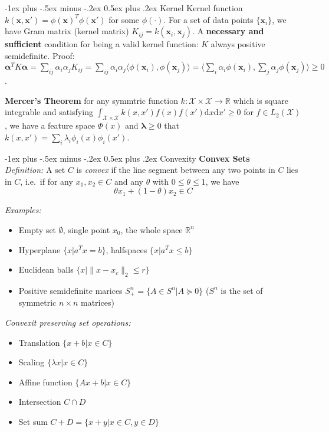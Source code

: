\documentclass[10pt,landscape]{article}
\makeatletter
\newcommand{\vect}[1]{\boldsymbol{#1}}
\renewcommand{\section}{\@startsection{section}{1}{0mm}%
                                {-1ex plus -.5ex minus -.2ex}%
                                {0.5ex plus .2ex}%
                                {\normalfont\large\bfseries}}
\makeatother
\begin{document}
\begin{multicols}{3}
\section{Kernel}
Kernel function $k(\vect{x},\vect{x}') = \phi(\vect{x})^T \phi(\vect{x}')$ for some $\phi(\cdot)$. For a set of data points $\{\vect{x}_i\} $, we have Gram matrix (kernel matrix) $K_{ij} = k(\vect{x}_i, \vect{x}_j)$. A \textbf{necessary and sufficient} condition for being a valid kernel function: $K$ always positive semidefinite. Proof: $\vect{\alpha}^T K \vect{\alpha} = \sum_{ij} \alpha_i \alpha_j K_{ij} = \sum_{ij} \alpha_i \alpha_j \langle \phi(\vect{x}_i), \phi(\vect{x}_j) \rangle = \langle \sum_i \alpha_i \phi(\vect{x}_i),  \sum_j \alpha_j \phi(\vect{x}_j) \rangle \geq 0$.

\textbf{Mercer's Theorem} for any symmtric function $k: \mathcal{X} \times \mathcal{X} \rightarrow \mathbb{R}$ which is square integrable and satisfying $\int_{\mathcal{X} \times \mathcal{X}} k(x,x') f(x) f(x') \mathrm{d}x \mathrm{d}x' \geq 0$ for $f \in L_2(\mathcal{X})$, we have a feature space $\Phi(x)$ and $\vect{\lambda} \geq 0 $ that $k(x,x') = \sum_i \lambda_i \phi_i(x) \phi_i(x')$.


\section{Convexity}
\textbf{Convex Sets} \\
\emph{Definition:} A set $C$ is \emph{convex} if the line segment between any two points in $C$ lies in $C$, i.e.\, if for any $x_1, x_2 \in C$ and any $\theta$ with $0 \leq \theta \leq 1$, we have \\
$$ \theta x_1 + (1 - \theta) x_2 \in C $$

\emph{Examples:}
\begin{itemize}
	\item Empty set $\emptyset$, single point ${x_0}$, the whole space $\mathbb{R}^n$
	\item Hyperplane $\{ x | a^T x = b \}$, halfspaces $\{ x | a^T x \leq b \}$
	\item Euclidean balls $\{ x | \| x - x_c \|_2 \leq r \}$
	\item Positive semidefinite marices $S_+^n = \{ A \in S^n | A \succeq 0 \}$ ($S^n$ is the set of symmetric $n \times n$ matrices)
\end{itemize}

\emph{Convexit preserving set operations:}
\begin{itemize}
	\item Translation $\{ x + b | x \in C \}$
	\item Scaling $\{ \lambda x | x \in C \}$
	\item Affine function $\{ Ax + b | x \in C\}$
	\item Intersection $C \cap D$
	\item Set sum $C + D = \{ x + y | x \in C, y \in D \}$
\end{itemize}


\end{multicols}
\end{document}
